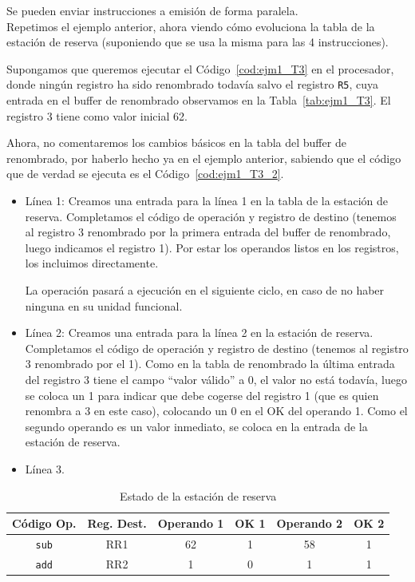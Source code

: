 Se pueden enviar instrucciones a emisión de forma paralela.\\

Repetimos el ejemplo anterior, ahora viendo cómo evoluciona la tabla de la estación de reserva (suponiendo que se usa la misma para las 4 instrucciones).

\begin{ejemplo}
    Supongamos que queremos ejecutar el Código~\ref{cod:ejm1_T3} en el procesador, donde ningún registro ha sido renombrado todavía salvo el registro \verb|R5|, cuya entrada en el buffer de renombrado observamos en la Tabla~\ref{tab:ejm1_T3}. El registro 3 tiene como valor inicial 62.

    Ahora, no comentaremos los cambios básicos en la tabla del buffer de renombrado, por haberlo hecho ya en el ejemplo anterior, sabiendo que el código que de verdad se ejecuta es el Código~\ref{cod:ejm1_T3_2}.
    \begin{itemize}
        \item Línea 1: Creamos una entrada para la línea 1 en la tabla de la estación de reserva. Completamos el código de operación y registro de destino (tenemos al registro 3 renombrado por la primera entrada del buffer de renombrado, luego indicamos el registro 1). Por estar los operandos listos en los registros, los incluimos directamente.

            La operación pasará a ejecución en el siguiente ciclo, en caso de no haber ninguna en su unidad funcional.
        \item Línea 2: Creamos una entrada para la línea 2 en la estación de reserva. Completamos el código de operación y registro de destino (tenemos al registro 3 renombrado por el 1). Como en la tabla de renombrado la última entrada del registro 3 tiene el campo ``valor válido'' a 0, el valor no está todavía, luego se coloca un 1 para indicar que debe cogerse del registro 1 (que es quien renombra a 3 en este caso), colocando un 0 en el OK del operando 1. Como el segundo operando es un valor inmediato, se coloca en la entrada de la estación de reserva.
        \item Línea 3.
    \end{itemize}

    \begin{table}[H]
    \centering
    \begin{tabular}{|c|c|c|c|c|c|}
        \hline
        Código Op. & Reg. Dest. & Operando 1 & OK 1 & Operando 2 & OK 2 \\
        \hline
        \verb|sub| & RR1 & 62 & 1 & 58 & 1 \\
        \hline
        \verb|add| & RR2 & 1 & 0 & 1 & 1 \\
        \hline
    \end{tabular}
    \caption{Estado de la estación de reserva}
    \label{tab:ejm2_T3}
    \end{table}
\end{ejemplo}
